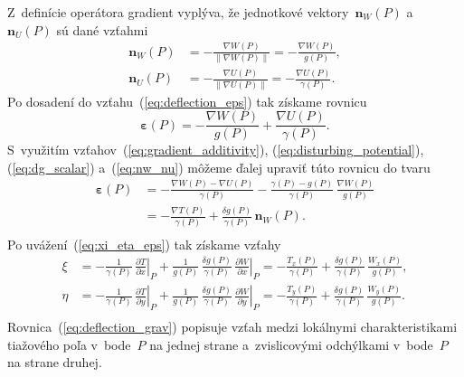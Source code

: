 \documentclass[a4paper,12pt]{book}
\let\vec\mathbf
\begin{document}
Z~definície operátora gradient vyplýva, že jednotkové vektory~$\vec n_W(P)$ 
a~$\vec n_U(P)$ sú dané vzťahmi
%
\begin{equation}
\label{eq:nw_nu}
\begin{split}
\vec n_W(P) &= -\frac{\nabla W(P)}{\| \nabla W(P) \|} = -\frac{\nabla 
W(P)}{g(P)}{,}\\
%
\vec n_U(P) &= -\frac{\nabla U(P)}{\| \nabla U(P) \|} = -\frac{\nabla 
U(P)}{\gamma(P)}{.}
\end{split}
\end{equation}
%
Po dosadení do vzťahu~(\ref{eq:deflection_eps}) tak získame rovnicu
%
\begin{equation}
\label{eq:deflection_eps2}
\boldsymbol\varepsilon(P) = -\frac{\nabla W(P)}{g(P)} + \frac{\nabla 
U(P)}{\gamma(P)}{.}
\end{equation}
%
S~využitím vzťahov~(\ref{eq:gradient_additivity}), 
(\ref{eq:disturbing_potential}),  (\ref{eq:dg_scalar}) a~(\ref{eq:nw_nu}) 
môžeme ďalej upraviť túto rovnicu do tvaru
%
\begin{equation}
\label{eq:deflection_eps3}
\begin{split}
\boldsymbol\varepsilon(P) &= - \frac{\nabla W(P) - \nabla U(P)}{\gamma(P)} 
- \frac{\gamma(P) - g(P)}{\gamma(P)} \, \frac{\nabla W(P)}{g(P)}\\
%
&= - \frac{\nabla T(P)}{\gamma(P)} + \frac{\delta g(P)}{\gamma(P)} \, \vec 
n_W(P){.}\\
\end{split}
\end{equation}
%
Po uvážení~(\ref{eq:xi_eta_eps}) tak získame vzťahy
%
\begin{equation}
\label{eq:deflection_grav}
\begin{split}
\xi &= -\frac{1}{\gamma(P)} \, \left.\frac{\partial T}{\partial x}\right|_{P} 
+ \frac{1}{g(P)} \, \frac{\delta g(P)}{\gamma(P)} \, \left.\frac{\partial 
W}{\partial x}\right|_P = -\frac{T_x(P)}{\gamma(P)} + \frac{\delta 
g(P)}{\gamma(P)} \, \frac{W_x(P)}{g(P)}{,}\\
%
\eta &= -\frac{1}{\gamma(P)} \, \left.\frac{\partial T}{\partial y}\right|_{P} 
+ \frac{1}{g(P)} \, \frac{\delta g(P)}{\gamma(P)} \, \left.\frac{\partial 
W}{\partial y}\right|_P= -\frac{T_y(P)}{\gamma(P)} + \frac{\delta 
g(P)}{\gamma(P)} \, \frac{W_y(P)}{g(P)}{.}\\
\end{split}
\end{equation}
%
Rovnica~(\ref{eq:deflection_grav}) popisuje vzťah medzi lokálnymi 
charakteristikami tiažového poľa v~bode~$P$ na jednej strane a~zvislicovými 
odchýlkami v~bode~$P$ na strane druhej.
\end{document}
